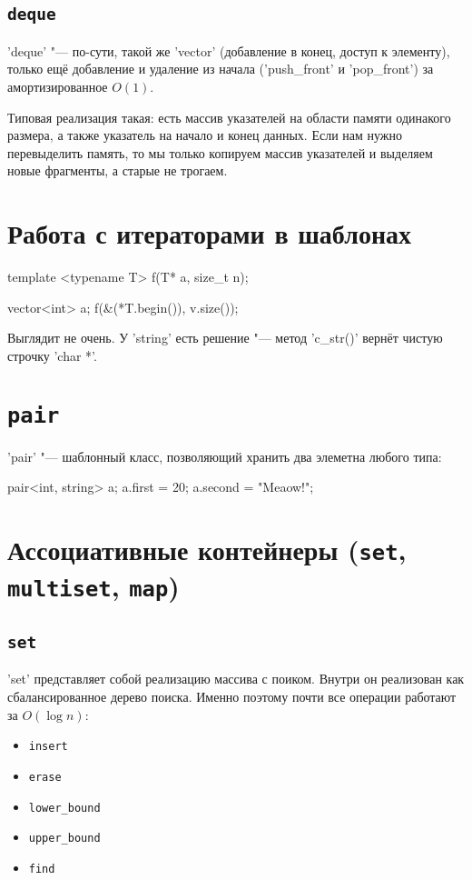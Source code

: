 \subsection{\texttt{deque}}
\cpp'deque' "--- по-сути, такой же \cpp'vector' (добавление в конец, доступ к элементу), только ещё добавление и удаление из начала
(\cpp'push_front' и \cpp'pop_front') за амортизированное $O(1)$.

Типовая реализация такая: есть массив указателей на области памяти одинакого размера, а также указатель на начало и конец данных.
Если нам нужно перевыделить память, то мы только копируем массив указателей и выделяем новые фрагменты, а старые не трогаем.

\section{Работа с итераторами в шаблонах}

\begin{cppcode}
template <typename T>
f(T* a, size_t n);

vector<int> a;
f(&(*T.begin()), v.size());
\end{cppcode}

Выглядит не очень. У \cpp'string' есть решение "--- метод \cpp'c_str()' вернёт чистую строчку \cpp'char *'.

\section{\texttt{pair}}
\cpp'pair' "--- шаблонный класс, позволяющий хранить два элеметна любого типа:
\begin{cppcode}
pair<int, string> a;
a.first = 20;
a.second = "Meaow!";
\end{cppcode}

\section{Ассоциативные контейнеры (\texttt{set}, \texttt{multiset}, \texttt{map})}

\subsection{\texttt{set}}
\cpp'set' представляет собой реализацию массива с поиком.
Внутри он реализован как сбалансированное дерево поиска.
Именно поэтому почти все операции работают за $O(\log n)$:
\begin{itemize}
	\item \verb'insert'
	\item \verb'erase'
	\item \verb'lower_bound'
	\item \verb'upper_bound'
	\item \verb'find'
\end{itemize}

